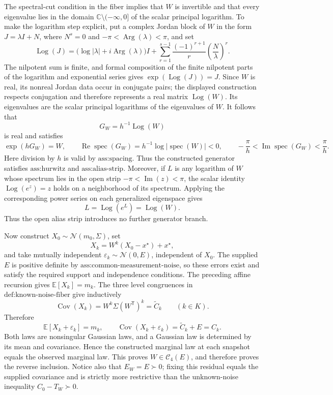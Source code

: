 The spectral-cut condition in the fiber implies that \(W\) is invertible and that every eigenvalue lies in the domain \(\mathbb C\setminus(-\infty,0]\) of the scalar principal logarithm.  To make the logarithm step explicit, put a complex Jordan block of \(W\) in the form \(J=\lambda I+N\), where \(N^s=0\) and \(-\pi<\operatorname{Arg}(\lambda)<\pi\), and set
\[
 \operatorname{Log}(J)
 =\bigl(\log|\lambda|+i\operatorname{Arg}(\lambda)\bigr)I
  +\sum_{r=1}^{s-1}\frac{(-1)^{r+1}}{r}\left(\frac{N}{\lambda}\right)^r.
\]
The nilpotent sum is finite, and formal composition of the finite nilpotent parts of the logarithm and exponential series gives \(\exp(\operatorname{Log}(J))=J\).  Since \(W\) is real, its nonreal Jordan data occur in conjugate pairs; the displayed construction respects conjugation and therefore represents a real matrix \(\operatorname{Log}(W)\).  Its eigenvalues are the scalar principal logarithms of the eigenvalues of \(W\).  It follows that
\[
 G_W=h^{-1}\operatorname{Log}(W)
\]
is real and satisfies
\[
 \exp(hG_W)=W,
 \qquad
 \operatorname{Re}\operatorname{spec}(G_W)
 =h^{-1}\log|\operatorname{spec}(W)|<0,
 \qquad
 -\frac{\pi}{h}<\operatorname{Im}\operatorname{spec}(G_W)<\frac{\pi}{h}.
\]
Here division by \(h\) is valid by \(\text{ass:spacing}\).  Thus the constructed generator satisfies \(\text{ass:hurwitz}\) and \(\text{ass:alias-strip}\).  Moreover, if \(L\) is any logarithm of \(W\) whose spectrum lies in the open strip \(-\pi<\operatorname{Im}(z)<\pi\), the scalar identity \(\operatorname{Log}(e^z)=z\) holds on a neighborhood of its spectrum.  Applying the corresponding power series on each generalized eigenspace gives
\[
 L=\operatorname{Log}(e^L)=\operatorname{Log}(W).
\]
Thus the open alias strip introduces no further generator branch.

Now construct \(X_0\sim\mathcal N(m_0,\Sigma)\), set
\[
 X_k=W^k(X_0-x^\star)+x^\star,
\]
and take mutually independent \(\varepsilon_k\sim\mathcal N(0,E)\), independent of \(X_0\).  The supplied \(E\) is positive definite by \(\text{ass:common-measurement-noise}\), so these errors exist and satisfy the required support and independence conditions.  The preceding affine recursion gives \(\mathbb E[X_k]=m_k\).  The three level congruences in \(\text{def:known-noise-fiber}\) give inductively
\[
 \operatorname{Cov}(X_k)
 =W^k\Sigma(W^{\mathsf T})^k
 =\widetilde C_k
 \qquad(k\in K).
\]
Therefore
\[
 \mathbb E[X_k+\varepsilon_k]=m_k,
 \qquad
 \operatorname{Cov}(X_k+\varepsilon_k)=\widetilde C_k+E=C_k.
\]
Both laws are nonsingular Gaussian laws, and a Gaussian law is determined by its mean and covariance.  Hence the constructed marginal law at each snapshot equals the observed marginal law.  This proves \(W\in\mathcal C_4(E)\), and therefore proves the reverse inclusion.  Notice also that \(E_W=E\succ0\); fixing this residual equals the supplied covariance and is strictly more restrictive than the unknown-noise inequality \(C_0-T_W\succ0\).

